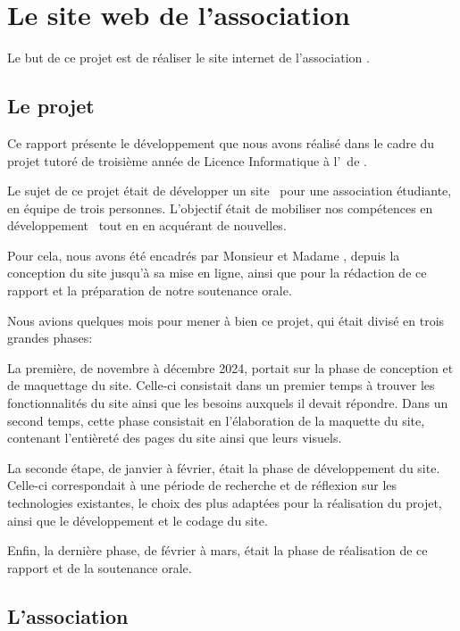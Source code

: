 \chapter{Le site web de l'association \ofni}
\label{chap:site}

Le but de ce projet est de réaliser le site internet de l'association \ofni.

\section{Le projet}

Ce rapport présente le développement que nous avons réalisé dans le cadre du projet tutoré de troisième année de Licence Informatique à l'\univ\ de .
\bigskip

Le sujet de ce projet était de développer un site \web\ pour une association étudiante, en équipe de trois personnes. L'objectif était de mobiliser nos compétences en développement \web\ tout en en acquérant de nouvelles.

Pour cela, nous avons été encadrés par Monsieur  et Madame , depuis la conception du site jusqu'à sa mise en ligne, ainsi que pour la rédaction de ce rapport et la préparation de notre soutenance orale.
\bigskip

Nous avions quelques mois pour mener à bien ce projet, qui était divisé en trois grandes phases:

La première, de novembre à décembre 2024, portait sur la phase de conception et de maquettage du site. 
Celle-ci consistait dans un premier temps à trouver les fonctionnalités du site ainsi que les besoins auxquels il devait répondre. 
Dans un second temps, cette phase consistait en l'élaboration de la maquette du site, contenant l'entièreté des pages du site ainsi que leurs visuels.

La seconde étape, de janvier à février, était la phase de développement du site. 
Celle-ci correspondait à une période de recherche et de réflexion sur les technologies existantes, le choix des plus adaptées pour la réalisation du projet, ainsi que le développement et le codage du site.

Enfin, la dernière phase, de février à mars, était la phase de réalisation de ce rapport et de la soutenance orale.

\section{L'association \ofni}

